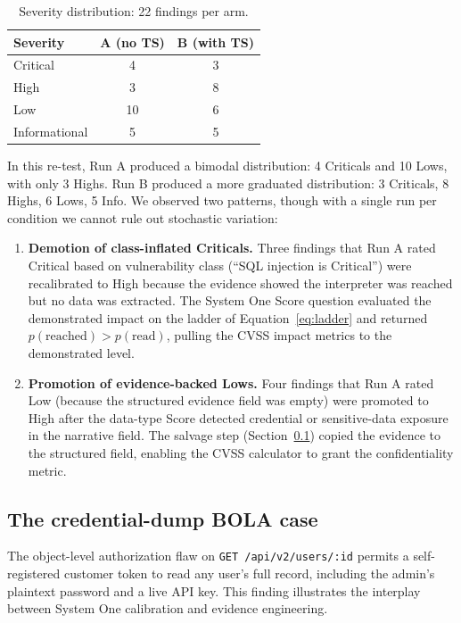 \documentclass[conference]{IEEEtran}
\begin{document}
\begin{table}[h]
\centering
\caption{Severity distribution: 22 findings per arm.}
\label{tab:sev}
\small
\begin{tabular}{@{}lcc@{}}
\toprule
\textbf{Severity} & \textbf{A (no TS)} & \textbf{B (with TS)} \\
\midrule
Critical & 4 & 3 \\
High & 3 & 8 \\
Low & 10 & 6 \\
Informational & 5 & 5 \\
\bottomrule
\end{tabular}
\end{table}

In this re-test, Run A produced a bimodal distribution: 4 Criticals and 10 Lows, with only 3 Highs. Run B produced a more graduated distribution: 3 Criticals, 8 Highs, 6 Lows, 5 Info. We observed two patterns, though with a single run per condition we cannot rule out stochastic variation:

\begin{enumerate}[leftmargin=*]
\item \textbf{Demotion of class-inflated Criticals.} Three findings that Run A rated Critical based on vulnerability class (``SQL injection is Critical'') were recalibrated to High because the evidence showed the interpreter was reached but no data was extracted. The System One Score question evaluated the demonstrated impact on the ladder of Equation~\eqref{eq:ladder} and returned $p(\text{reached}) > p(\text{read})$, pulling the CVSS impact metrics to the demonstrated level.

\item \textbf{Promotion of evidence-backed Lows.} Four findings that Run A rated Low (because the structured evidence field was empty) were promoted to High after the data-type Score detected credential or sensitive-data exposure in the narrative field. The salvage step (Section~\ref{sec:bola}) copied the evidence to the structured field, enabling the CVSS calculator to grant the confidentiality metric.
\end{enumerate}

\subsection{The credential-dump BOLA case}\label{sec:bola}

The object-level authorization flaw on \texttt{GET /api/v2/users/:id} permits a self-registered customer token to read any user's full record, including the admin's plaintext password and a live API key. This finding illustrates the interplay between System One calibration and evidence engineering.
\end{document}
